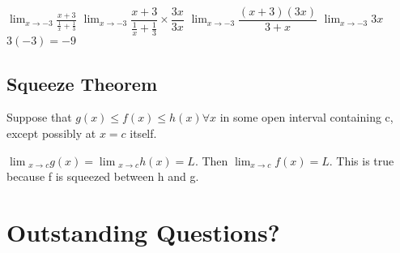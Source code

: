 \documentclass[12pt]{article}
\begin{document}
$\lim_{x \to -3}\frac{x+3}{\frac{1}{x}+\frac{1}{3}}$
$\lim_{x \to -3}\dfrac{x+3}{\frac{1}{x}+\frac{1}{3}} \times \dfrac{3x}{3x}$
$\lim_{x \to -3} \dfrac{(x+3)(3x)}{3+x}$
$\lim_{x \to -3} 3x$
$3(-3) = -9$

\subsection{Squeeze Theorem}

Suppose that $g(x) \leq f(x) \leq h(x) \forall x$ in some open interval containing c, except possibly at $x=c$
itself.

$\lim{_{x \to c}}g(x) = \lim{_{x \to c}}h(x) = L$. Then  $\lim_{x \to c}f(x) = L$.
This is true because f is squeezed between h and g.

\section{Outstanding Questions?}
\end{document}
